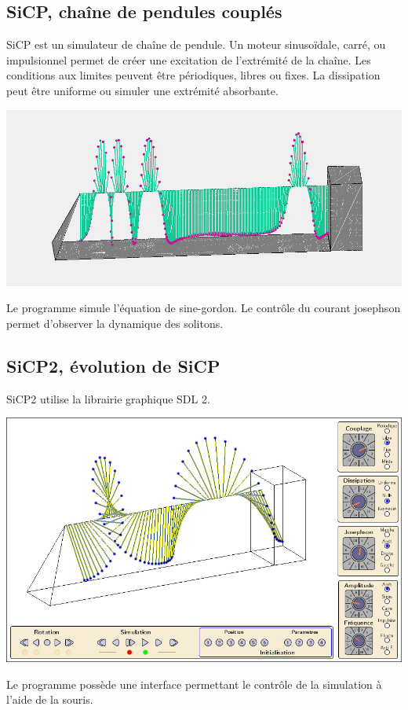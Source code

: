 \subsection{SiCP, chaîne de pendules couplés}
%
SiCP est un simulateur de chaîne de pendule. Un moteur sinusoïdale, carré, ou impulsionnel permet de créer une excitation de l'extrémité de la chaîne. Les conditions aux limites peuvent être périodiques, libres ou fixes. La dissipation peut être uniforme ou simuler une extrémité absorbante.
%
\begin{center}
\includegraphics[scale=0.41]{./titre/SiCP}
\end{center}
%
Le programme simule l'équation de sine-gordon. Le contrôle du courant josephson permet d'observer la dynamique des solitons.
%
\subsection{SiCP2, évolution de SiCP}
%
SiCP2 utilise la librairie graphique SDL 2.
%
\begin{center}
\includegraphics[scale=0.41]{./illustration/SiCP22}
\end{center}
%
Le programme possède une interface permettant le contrôle de la simulation à l'aide de la souris.
